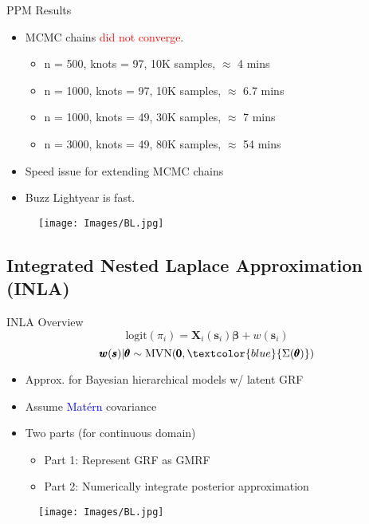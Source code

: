\documentclass{beamer}
\begin{document}
\begin{frame}{PPM Results}

\begin{itemize}
\addtolength{\itemsep}{0.5\baselineskip}
\item MCMC chains \textcolor{red}{did not converge}. \\
      \begin{itemize}
      \addtolength{\itemsep}{0.5\baselineskip}
      \item n = 500, knots = 97, 10K samples, $\approx$ 4 mins
      \item n = 1000, knots = 97, 10K samples, $\approx$ 6.7 mins
      \item n = 1000, knots = 49, 30K samples, $\approx$ 7 mins
      \item n = 3000, knots = 49, 80K samples, $\approx$ 54 mins
      \end{itemize}
\item Speed issue for extending MCMC chains
\item Buzz Lightyear is fast.
\end{itemize}
  \begin{figure}[H]
	\centering
	\texttt{[image: Images/BL.jpg]}
	\end{figure}
\end{frame}

\subsection{Integrated Nested Laplace Approximation (INLA)}

\begin{frame}{INLA Overview}
$$ \text{logit}(\pi_{i}) = \pmb{X}_{i}(\pmb{s}_{i})\pmb{\beta} + w(\pmb{s}_{i}) $$
$$\pmb{w}(\pmb{s}) | \pmb{\theta} \sim \text{MVN}(\pmb{0}, \textcolor{blue}{\Sigma(\pmb{\theta})})$$
\begin{itemize}
\addtolength{\itemsep}{0.5\baselineskip}
\item Approx. for Bayesian hierarchical models w/ latent GRF
\item Assume \textcolor{blue}{Mat\'ern} covariance
\item Two parts (for continuous domain)
  \begin{itemize}
  \addtolength{\itemsep}{0.5\baselineskip}
  \item Part 1: Represent GRF as GMRF 
  \item Part 2: Numerically integrate posterior approximation
  \end{itemize}
\end{itemize}
  \begin{figure}[H]
	\centering
	\texttt{[image: Images/BL.jpg]}
	\end{figure}
\end{frame}
\end{document}
